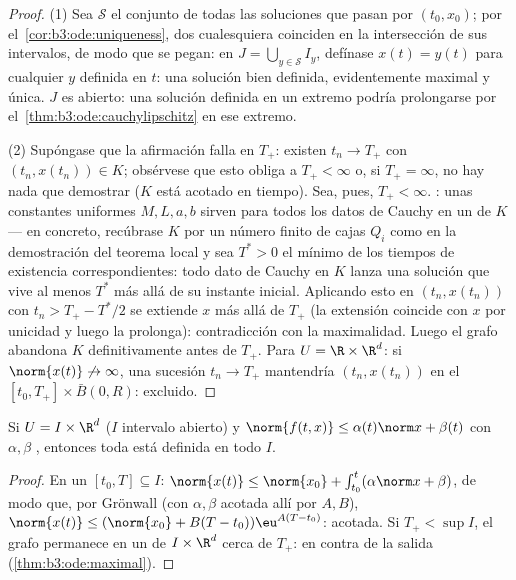 \begin{proof}
(1) Sea $\mathcal S$ el conjunto de todas las soluciones que pasan por
$(t_0, x_0)$; por el~\cref{cor:b3:ode:uniqueness}, dos cualesquiera
coinciden en la intersección de sus intervalos, de modo que se pegan: en
$J =
\bigcup_{y \in \mathcal S}I_y$, defínase $x(t) = y(t)$ para cualquier
$y$ definida en $t$: una solución bien definida, evidentemente maximal y
única. $J$ es abierto: una solución definida en un extremo podría
prolongarse por el~\cref{thm:b3:ode:cauchylipschitz} en ese extremo.

(2) Supóngase que la afirmación falla en $T_+$: existen $t_n \to
T_+$ con $(t_n, x(t_n)) \in K$; obsérvese que esto obliga a $T_+ <
\infty$ o, si $T_+ = \infty$, no hay nada que demostrar ($K$ está
acotado en tiempo). Sea, pues, $T_+ < \infty$. : unas
constantes uniformes $M, L, a,
b$ sirven para todos los datos de Cauchy en un
 de $K$ --- en concreto,
recúbrase $K$ por un número finito de cajas $Q_i$ como en la
demostración del teorema local y sea $T^* > 0$ el mínimo de los tiempos
de existencia correspondientes: todo dato de Cauchy en $K$ lanza una
solución que vive al menos $T^*$ más allá de su instante inicial.
Aplicando esto en $(t_n, x(t_n))$ con $t_n > T_+ -
T^*/2$ se extiende $x$ más allá de $T_+$ (la extensión coincide con $x$
por unicidad y luego la prolonga): contradicción con la maximalidad.
Luego el grafo abandona $K$ definitivamente antes de $T_+$. Para
$U = \R\times\R^d$: si $\norm{x(t)}\not\to\infty$, una sucesión
$t_n \to T_+$ mantendría $(t_n, x(t_n))$ en el
$[t_0, T_+]\times\bar B(0, R)$: excluido.
\end{proof}

\begin{corollary}
\label{cor:b3:ode:globallinear}
Si $U = I\times\R^d$ ($I$ intervalo abierto) y $\norm{f(t, x)}
\leq \alpha(t)\norm x + \beta(t)$ con $\alpha, \beta$
, entonces toda
 está definida en todo
$I$.
\end{corollary}

\begin{proof}
En un  $[t_0, T] \subseteq I$:
$\norm{x(t)} \leq
\norm{x_0} + \int_{t_0}^t(\alpha\norm x + \beta)$, de modo que, por
Grönwall (con $\alpha, \beta$ acotada allí por $A, B$),
$\norm{x(t)} \leq (\norm{x_0} + B(T - t_0))\eu^{A(T - t_0)}$:
acotada. Si $T_+ < \sup I$, el grafo permanece en un
 de $I\times\R^d$ cerca de
$T_+$: en contra de la salida
(\cref{thm:b3:ode:maximal}).
\end{proof}

